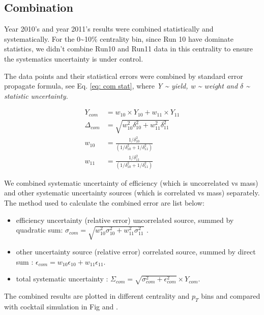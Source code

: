 \subsection{Combination}

Year 2010's and year 2011's results were combined statistically and
systematically. For the 0\textasciitilde{}10\% centrality bin, since
Run 10 have dominate statistics, we didn't combine Run10 and Run11
data in this centrality to ensure the systematics uncertainty is under
control. 

The data points and their statistical errors were combined by standard
error propagate formula, see Eq. \ref{eq: com stat}, where \emph{Y
\textasciitilde{} yield, w \textasciitilde{} weight and $\delta$
\textasciitilde{} statistic uncertainty.}

\begin{align}
Y_{com} & =w_{10}\times Y_{10}+w_{11}\times Y_{11}\nonumber \\
\Delta_{com} & =\sqrt{w_{10}^{2}\delta_{10}^{2}+w_{11}^{2}\delta_{11}^{2}}\nonumber \\
w_{10} & =\frac{1/\delta_{10}^{2}}{(1/\delta_{10}^{2}+1/\delta_{11}^{2})}\label{eq: com stat}\\
w_{11} & =\frac{1/\delta_{11}^{2}}{(1/\delta_{10}^{2}+1/\delta_{11}^{2})}\nonumber 
\end{align}


We combined systematic uncertainty of efficiency (which is uncorrelated
vs mass) and other systematic uncertainty sources (which is correlated
vs mass) separately. The method used to calculate the combined error
are list below:
\begin{itemize}
\item efficiency uncertainty (relative error) uncorrelated source, summed
by quadratic sum: $\sigma_{com}=\sqrt{w_{10}^{2}\sigma_{10}^{2}+w_{11}^{2}\sigma_{11}^{2}}$
.
\item other uncertainty source (relative error) correlated source, summed
by direct sum : $\epsilon_{com}=w_{10}\epsilon_{10}+w_{11}\epsilon_{11}$.
\item total systematic uncertainty : $\Sigma{}_{com}=\sqrt{\sigma_{com}^{2}+\epsilon_{com}^{2}}\times Y_{com}$.
\end{itemize}
The combined results are plotted in different centrality and $p_{T}$
bins and compared with cocktail simulation in Fig and .

